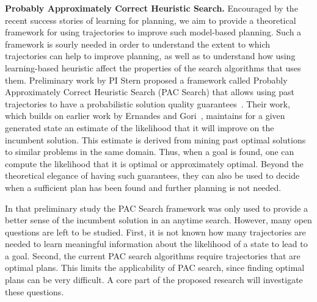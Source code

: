 {\bf Probably Approximately Correct Heuristic Search.} 
Encouraged by the recent success stories of learning for planning, we aim to provide a theoretical framework for using trajectories to improve such model-based planning. Such a framework is sourly needed in order to understand the extent to which trajectories can help to improve planning, as well as to understand how using learning-based heuristic affect the properties of the search algorithms that uses them. Preliminary work by PI Stern proposed a framework called Probably Approximately Correct Heuristic Search (PAC Search) that allows using past trajectories to have a probabilistic solution quality guarantees~\cite{stern2011probably,stern2012search}. Their work, which builds on earlier work by Ernandes and Gori~\cite{ernandes2004likely}, maintains for a given generated state an estimate of the likelihood that it will improve on the incumbent solution. This estimate is derived from mining past optimal solutions to similar problems in the same domain. Thus, when a goal is found, one can compute the likelihood that it is optimal or approximately optimal. Beyond the theoretical elegance of having such guarantees, they can also be used to decide when a sufficient plan has been found and further planning is not needed. 


In that preliminary study the PAC Search framework was only used to provide a better sense of the incumbent solution in an anytime search. However, many open questions are left to be studied. First, it is not known how many trajectories are needed to learn meaningful information about the likelihood of a state to lead to a goal. Second, the current PAC search algorithms require trajectories that are optimal plans. This limits the applicability of PAC search, since finding optimal plans can be very difficult. A core part of the proposed research will investigate these questions. 
















